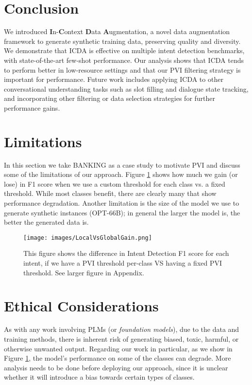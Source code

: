 \documentclass[11pt]{article}
\begin{document}
\section{Conclusion}
We introduced \textbf{I}n-\textbf{C}ontext \textbf{D}ata \textbf{A}ugmentation, a novel data augmentation framework to generate synthetic training data, preserving quality and diversity.
We demonstrate that ICDA is effective on multiple intent detection benchmarks, with state-of-the-art few-shot performance.
Our analysis shows that ICDA tends to perform better in low-resource settings and that our PVI filtering strategy is important for performance.
Future work includes applying ICDA to other conversational understanding tasks such as slot filling and dialogue state tracking, and incorporating other filtering or data selection strategies for further performance gains.

\section*{Limitations}
In this section we take BANKING as a case study to motivate PVI and discuss some of the limitations of our approach. Figure \ref{fig:local_vs_global} shows how much we gain (or lose) in F1 score when we use a custom threshold for each class vs. a fixed threshold. While most classes benefit, there are clearly many that show performance degradation. Another limitation is the size of the model we use to generate synthetic instances (OPT-66B); in general the larger the model is, the better the generated data is.

\begin{figure}[ht]
    \centering
    \texttt{[image: images/LocalVsGlobalGain.png]}
    \caption{This figure shows the difference in Intent Detection F1 score for each intent, if we have a PVI threshold per-class VS having a fixed PVI threshold. See larger figure in Appendix.}
    \label{fig:local_vs_global}
\end{figure}

\section*{Ethical Considerations}
As with any work involving PLMs (or \emph{foundation models}), due to the data and training methods, there is inherent risk of generating biased, toxic, harmful, or otherwise unwanted output. Regarding our work in particular, as we show in Figure \ref{fig:local_vs_global}, the model's performance on some of the classes can degrade. More analysis needs to be done before deploying our approach, since it is unclear whether it will introduce a bias towards certain types of classes.
\end{document}
